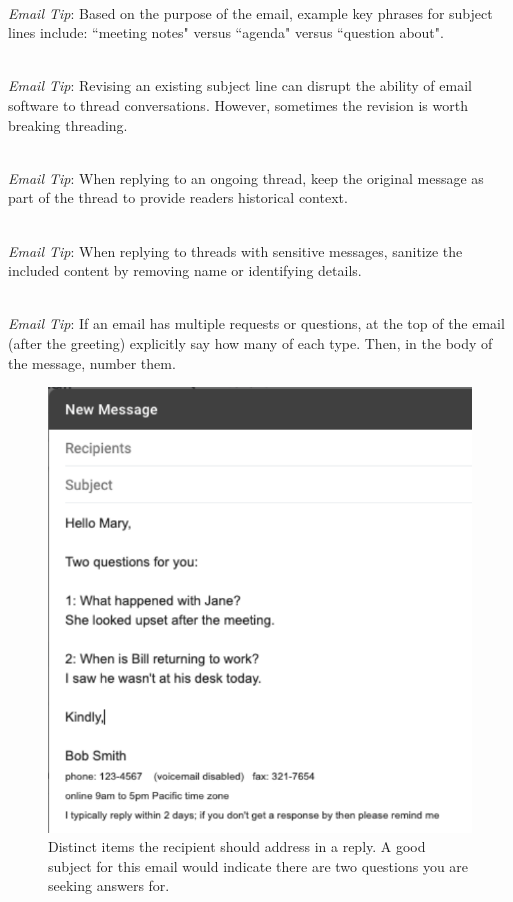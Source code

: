 \ \\
\textit{Email Tip}: Based on the purpose of the email, example key phrases for subject lines include: ``meeting notes" versus ``agenda" versus ``question about".

\ \\
\textit{Email Tip}: Revising an existing subject line can disrupt the ability of email software to thread conversations. However, sometimes the revision is worth breaking threading.

\ \\
\textit{Email Tip}: When replying to an ongoing thread, keep the original message as part of the thread to provide readers historical context.

\ \\
\textit{Email Tip}: When replying to threads with sensitive messages, sanitize the included content by removing name or identifying details.

\ \\
\textit{Email Tip}: If an email has multiple requests or questions, at the top of the email (after the greeting) explicitly say how many of each type. Then, in the body of the message, number them.

\begin{figure}
\includegraphics[width=1\textwidth]{images/email_two_questions.pdf}
\caption{Distinct items the recipient should address in a reply. A good subject for this email would indicate there are two questions you are seeking answers for.}
\label{fig:email_two_questions}
\end{figure}

